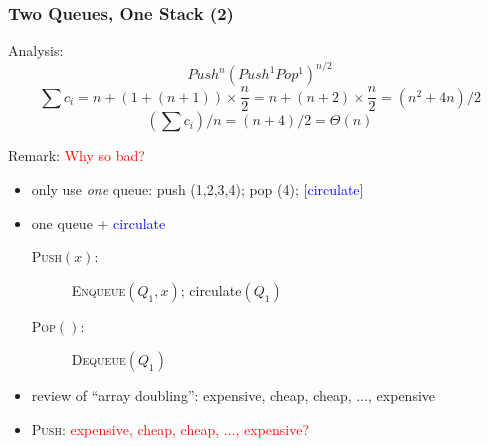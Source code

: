\documentclass{beamer}
\begin{document}
\begin{frame}
  \frametitle{Two Queues, One Stack (2)}

  Analysis:
  \[ Push^{n}(Push^1 Pop^1)^{n/2} \]
  \[ 
    \sum c_i = n + (1 + (n+1)) \times \frac{n}{2} = n + (n+2) \times
    \frac{n}{2} = (n^2 + 4n)/2
  \]
  \[ (\sum c_i)/n = (n+4)/2 = \Theta(n) \]
  
  \begin{block}{Remark: \textcolor{red}{Why so bad?}}
    \begin{itemize}
      \item only use \emph{one} queue: push
      (1,2,3,4); pop (4); [\textcolor{blue}{circulate}]
      \item one queue + \textcolor{blue}{circulate} 
        \begin{description}
          \item [\textsc{Push$(x)$}:] \textsc{Enqueue$(Q_1,x)$};
          circulate$(Q_1)$
          \item [\textsc{Pop$()$}:] \textsc{Dequeue$(Q_1)$}
        \end{description}
      \item review of ``array doubling'': expensive, cheap, cheap, $\ldots$,
      expensive
      \item \textsc{Push}: \textcolor{red}{expensive, cheap, cheap, $\ldots$,
      expensive?}
    \end{itemize}
  \end{block}
\end{frame}
\end{document}

